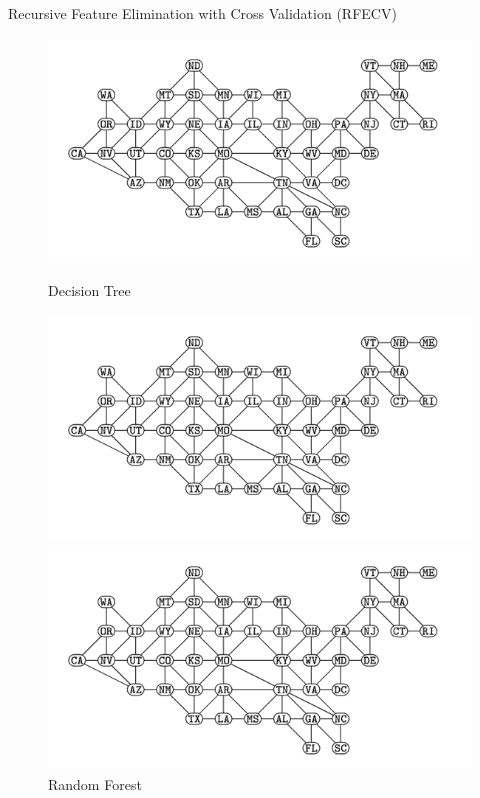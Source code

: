 \documentclass{beamer}
\begin{document}
\begin{frame}{Recursive Feature Elimination with Cross Validation (RFECV)}
    \begin{figure}
        \centering
        \begin{minipage}[t]{0.3\textwidth}
            \includegraphics[scale = 0.21]{contiguous-usa-graph}
            \caption{\tiny{Decision Tree}}
            \label{fig:tree}
        \end{minipage}\hfill
        \begin{minipage}[t]{0.3\textwidth}
            \includegraphics[scale = 0.21]{contiguous-usa-graph}
            \caption{\tiny{Random Forest}}
            \label{fig:rand_forest}
        \end{minipage}\hfill
        \begin{minipage}[t]{.3\textwidth}
            \includegraphics[scale = 0.21]{contiguous-usa-graph}

\end{minipage}
\end{figure}
\end{frame}
\end{document}
